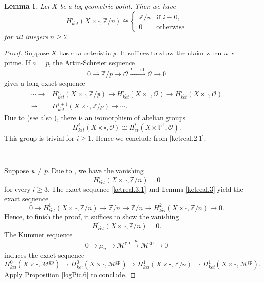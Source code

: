 \documentclass[11pt, a4paper]{amsart}
\newtheorem{lem}[thm]{Lemma}
\theoremstyle{definition}
\numberwithin{equation}{subsection}
\newcommand{\Z}{\mathbb{Z}}
\renewcommand{\P}{\mathbb{P}}
\newcommand{\id}{\operatorname{id}}   			%
\newcommand{\gp}{{\mathrm{gp}}}
\newcommand{\et}{{\acute{e}t}}
\newcommand{\cM}{\mathcal{M}}
\newcommand{\cO}{\mathcal{O}}
\newcommand{\boxx}{\square}
\begin{document}
\begin{lem}
\label{ketreal.2}
Let $X$ be a log geometric point.
Then we have
\[
H_{k\et}^i(X\times \boxx, \Z/n)
\cong
\left\{
\begin{array}{ll}
\Z/n &
\text{if }i=0,
\\
0 & \text{otherwise}
\end{array}
\right.
\]
for all integers $n\geq 2$.
\end{lem}
\begin{proof}
Suppose $X$ has characteristic $p$.
It suffices to show the claim when $n$ is prime.
If $n=p$,
the Artin-Schreier sequence
\[
0\to \Z/p \to \cO \xrightarrow{F-\id} \cO \to 0
\]
gives a long exact sequence
\begin{equation}
\label{ketreal.2.1}
\begin{split}
\cdots \to & H_{k\et}^i(X\times \boxx,\Z/p) \to H_{k\et}^i(X\times \boxx,\cO) \to H_{k\et}^i(X\times \boxx,\cO)\\
\to & H_{k\et}^{i+1}(X\times \boxx,\Z/p) \to \cdots.
\end{split}
\end{equation}
Due to \cite[Proposition 6.5]{KatoLog2} (see also \cite[Proposition 3.27]{MR2452875}), there is an isomorphism of abelian groups
\[
H_{k\et}^i(X\times \boxx,\cO)
\cong
H_{\et}^i(X\times \P^1,\cO).
\]
This group is trivial for $i\geq 1$.
Hence we conclude from \eqref{ketreal.2.1}.

\

Suppose $n\neq p$.
Due to \cite[Proposition 5.3]{MR1457738}, we have the vanishing
\[
H_{k\et}^i(X\times \boxx, \Z/n)=0
\]
for every $i\geq 3$.
The exact sequence \eqref{ketreal.3.1} and Lemma \ref{ketreal.3} yield the exact sequence
\[
0 \to H_{k\et}^1(X\times \boxx,\Z/n) \to  \Z/n
\to  \Z/n \to  H_{k\et}^2(X\times \boxx,\Z/n) \to  0.
\]
Hence, to finish the proof, it suffices to show the vanishing
\[
H_{k\et}^1(X\times \boxx, \Z/n)=0.
\]
The Kummer sequence
\[
0 \to \mu_n \to \cM^{\gp} \xrightarrow{\cdot n} \cM^{\gp} \to 0
\]
induces the exact sequence
\[
H_{k\et}^0(X\times \boxx,\cM^{\gp})
\to
H_{k\et}^0(X\times \boxx,\cM^{\gp})
\to
H_{k\et}^1(X\times \boxx,\Z/n)
\to
H_{k\et}^1(X\times \boxx,\cM^{\gp}).
\]
Apply Proposition \ref{logPic.6} to conclude.
\end{proof}
\end{document}
